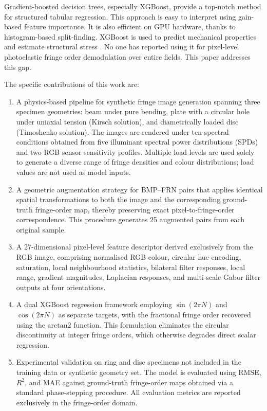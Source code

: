 \documentclass[review,12pt]{elsarticle}
\begin{document}
Gradient-boosted decision trees, especially XGBoost, provide a top-notch method for structured tabular regression. This approach is easy to interpret using gain-based feature importance. It is also efficient on GPU hardware, thanks to histogram-based split-finding. XGBoost is used to predict mechanical properties \cite{shi2023} and estimate structural stress \cite{vivekanandan2020}. No one has reported using it for pixel-level photoelastic fringe order demodulation over entire fields. This paper addresses this gap.

The specific contributions of this work are:

\begin{enumerate}[label=(\alph*)]

\item A physics-based pipeline for synthetic fringe image generation
spanning three specimen geometries: beam under pure bending, plate with a
circular hole under uniaxial tension (Kirsch solution), and diametrically
loaded disc (Timoshenko solution). The images are rendered under ten
spectral conditions obtained from five illuminant spectral power
distributions (SPDs) and two RGB sensor sensitivity profiles. Multiple
load levels are used solely to generate a diverse range of fringe
densities and colour distributions; load values are not used as model
inputs.

\item A geometric augmentation strategy for BMP--FRN pairs that applies
identical spatial transformations to both the image and the corresponding
ground-truth fringe-order map, thereby preserving exact pixel-to-fringe-order
correspondence. This procedure generates 25 augmented pairs from each
original sample.

\item A 27-dimensional pixel-level feature descriptor derived exclusively
from the RGB image, comprising normalised RGB colour, circular hue
encoding, saturation, local neighbourhood statistics, bilateral filter
responses, local range, gradient magnitudes, Laplacian responses, and
multi-scale Gabor filter outputs at four orientations.

\item A dual XGBoost regression framework employing
$\sin(2\pi N)$ and $\cos(2\pi N)$ as separate targets, with the fractional
fringe order recovered using the $\mathrm{arctan2}$ function. This
formulation eliminates the circular discontinuity at integer fringe
orders, which otherwise degrades direct scalar regression.

\item Experimental validation on ring and disc specimens not included in
the training data or synthetic geometry set. The model is evaluated using
RMSE, $R^2$, and MAE against ground-truth fringe-order maps obtained via a
standard phase-stepping procedure. All evaluation metrics are reported
exclusively in the fringe-order domain.

\end{enumerate}
\end{document}
